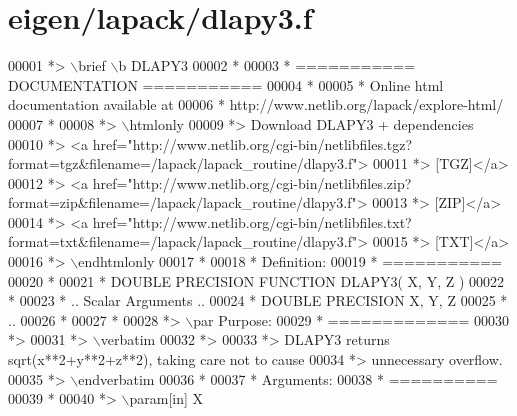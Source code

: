 \hypertarget{eigen_2lapack_2dlapy3_8f_source}{}\section{eigen/lapack/dlapy3.f}
\label{eigen_2lapack_2dlapy3_8f_source}

\begin{DoxyCode}
00001 \textcolor{comment}{*> \(\backslash\)brief \(\backslash\)b DLAPY3}
00002 \textcolor{comment}{*}
00003 \textcolor{comment}{*  =========== DOCUMENTATION ===========}
00004 \textcolor{comment}{*}
00005 \textcolor{comment}{* Online html documentation available at }
00006 \textcolor{comment}{*            http://www.netlib.org/lapack/explore-html/ }
00007 \textcolor{comment}{*}
00008 \textcolor{comment}{*> \(\backslash\)htmlonly}
00009 \textcolor{comment}{*> Download DLAPY3 + dependencies }
00010 \textcolor{comment}{*> <a
       href="http://www.netlib.org/cgi-bin/netlibfiles.tgz?format=tgz&filename=/lapack/lapack\_routine/dlapy3.f"> }
00011 \textcolor{comment}{*> [TGZ]</a> }
00012 \textcolor{comment}{*> <a
       href="http://www.netlib.org/cgi-bin/netlibfiles.zip?format=zip&filename=/lapack/lapack\_routine/dlapy3.f"> }
00013 \textcolor{comment}{*> [ZIP]</a> }
00014 \textcolor{comment}{*> <a
       href="http://www.netlib.org/cgi-bin/netlibfiles.txt?format=txt&filename=/lapack/lapack\_routine/dlapy3.f"> }
00015 \textcolor{comment}{*> [TXT]</a>}
00016 \textcolor{comment}{*> \(\backslash\)endhtmlonly }
00017 \textcolor{comment}{*}
00018 \textcolor{comment}{*  Definition:}
00019 \textcolor{comment}{*  ===========}
00020 \textcolor{comment}{*}
00021 \textcolor{comment}{*       DOUBLE PRECISION FUNCTION DLAPY3( X, Y, Z )}
00022 \textcolor{comment}{* }
00023 \textcolor{comment}{*       .. Scalar Arguments ..}
00024 \textcolor{comment}{*       DOUBLE PRECISION   X, Y, Z}
00025 \textcolor{comment}{*       ..}
00026 \textcolor{comment}{*  }
00027 \textcolor{comment}{*}
00028 \textcolor{comment}{*> \(\backslash\)par Purpose:}
00029 \textcolor{comment}{*  =============}
00030 \textcolor{comment}{*>}
00031 \textcolor{comment}{*> \(\backslash\)verbatim}
00032 \textcolor{comment}{*>}
00033 \textcolor{comment}{*> DLAPY3 returns sqrt(x**2+y**2+z**2), taking care not to cause}
00034 \textcolor{comment}{*> unnecessary overflow.}
00035 \textcolor{comment}{*> \(\backslash\)endverbatim}
00036 \textcolor{comment}{*}
00037 \textcolor{comment}{*  Arguments:}
00038 \textcolor{comment}{*  ==========}
00039 \textcolor{comment}{*}
00040 \textcolor{comment}{*> \(\backslash\)param[in] X}

\end{DoxyCode}
